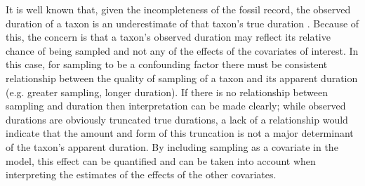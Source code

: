 \documentclass[11pt]{article}
\begin{document}
It is well known that, given the incompleteness of the fossil record, the observed duration of a taxon is an underestimate of that taxon's true duration \citep{Solow1997,Wagner2013a,Wang2004,Liow2010b,Alroy2014a,Foote1996e}. Because of this, the concern is that a taxon's observed duration may reflect its relative chance of being sampled and not any of the effects of the covariates of interest. In this case, for sampling to be a confounding factor there must be consistent relationship between the quality of sampling of a taxon and its apparent duration (e.g. greater sampling, longer duration). If there is no relationship between sampling and duration then interpretation can be made clearly; while observed durations are obviously truncated true durations, a lack of a relationship would indicate that the amount and form of this truncation is not a major determinant of the taxon's apparent duration. By including sampling as a covariate in the model, this effect can be quantified and can be taken into account when interpreting the estimates of the effects of the other covariates.


\end{document}
